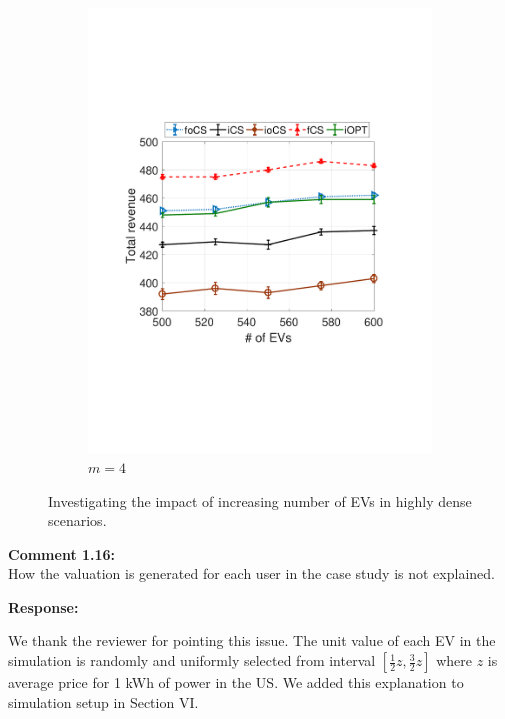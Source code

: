\documentclass[11pt]{article}
\begin{document}
\begin{figure}[t]
\begin{subfigure}[b]{0.3\textwidth}
\begin{center}
						\includegraphics[width=\textwidth]{V-NN4.pdf}
						\caption{$m=4$}
						\label{fig:V-NN4}
					\end{center}
				\end{subfigure}%
				\caption{Investigating the impact of increasing number of EVs in highly dense scenarios.} 
				\label{fig:V-NN}	
			\end{figure}

\vspace{5mm}
{
{\color{blue}\noindent\textbf{Comment 1.16:}\\
How the valuation is generated for each user in the case study is not explained.
}}

\vspace{5mm}
\noindent\textbf{Response:}

We thank the reviewer for pointing this issue. The unit value of each EV in the simulation is randomly and uniformly selected from interval $[\frac{1}{2}z,\frac{3}{2}z]$ where $z$ is average price for 1 kWh of power in the US. We added this explanation to simulation setup in Section VI.
\end{document}
